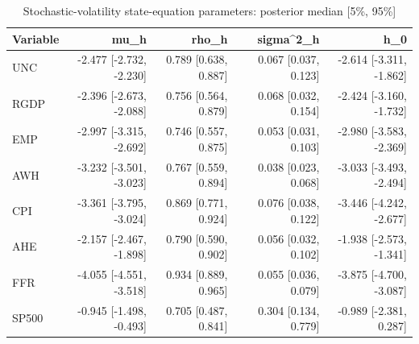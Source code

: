 \begin{table}[htbp]
\centering
\caption{Stochastic-volatility state-equation parameters: posterior median [5\%, 95\%]}
\label{tab:sv}
\begin{tabular}{lrrrr}
\toprule
Variable & mu\_h & rho\_h & sigma^2\_h & h\_0 \\
\midrule
UNC & -2.477 [-2.732, -2.230] & 0.789 [0.638, 0.887] & 0.067 [0.037, 0.123] & -2.614 [-3.311, -1.862] \\
RGDP & -2.396 [-2.673, -2.088] & 0.756 [0.564, 0.879] & 0.068 [0.032, 0.154] & -2.424 [-3.160, -1.732] \\
EMP & -2.997 [-3.315, -2.692] & 0.746 [0.557, 0.875] & 0.053 [0.031, 0.103] & -2.980 [-3.583, -2.369] \\
AWH & -3.232 [-3.501, -3.023] & 0.767 [0.559, 0.894] & 0.038 [0.023, 0.068] & -3.033 [-3.493, -2.494] \\
CPI & -3.361 [-3.795, -3.024] & 0.869 [0.771, 0.924] & 0.076 [0.038, 0.122] & -3.446 [-4.242, -2.677] \\
AHE & -2.157 [-2.467, -1.898] & 0.790 [0.590, 0.902] & 0.056 [0.032, 0.102] & -1.938 [-2.573, -1.341] \\
FFR & -4.055 [-4.551, -3.518] & 0.934 [0.889, 0.965] & 0.055 [0.036, 0.079] & -3.875 [-4.700, -3.087] \\
SP500 & -0.945 [-1.498, -0.493] & 0.705 [0.487, 0.841] & 0.304 [0.134, 0.779] & -0.989 [-2.381, 0.287] \\
\bottomrule
\end{tabular}
\end{table}